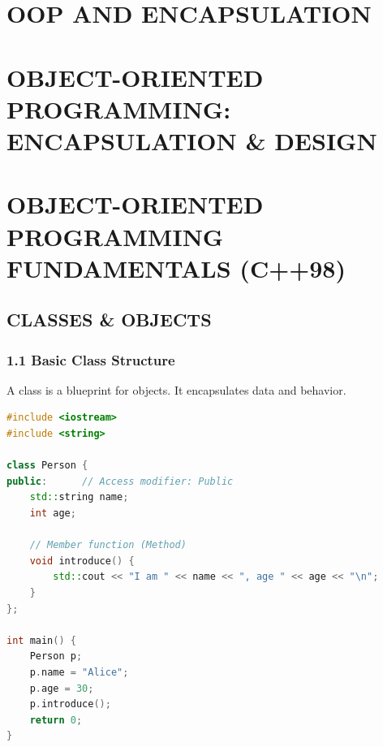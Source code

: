 \hypertarget{oop-and-encapsulation}{%
\chapter{OOP AND ENCAPSULATION}\label{oop-and-encapsulation}}

\hypertarget{object-oriented-programming-encapsulation-design}{%
\chapter{OBJECT-ORIENTED PROGRAMMING: ENCAPSULATION \&
DESIGN}\label{object-oriented-programming-encapsulation-design}}

\hypertarget{object-oriented-programming-fundamentals-c98}{%
\chapter{OBJECT-ORIENTED PROGRAMMING FUNDAMENTALS
(C++98)}\label{object-oriented-programming-fundamentals-c98}}

\hypertarget{classes-objects}{%
\section{CLASSES \& OBJECTS}\label{classes-objects}}

\hypertarget{basic-class-structure}{%
\subsection{1.1 Basic Class Structure}\label{basic-class-structure}}

A class is a blueprint for objects. It encapsulates data and behavior.

\begin{lstlisting}[language={C++}]
#include <iostream>
#include <string>

class Person {
public:      // Access modifier: Public
    std::string name;
    int age;
    
    // Member function (Method)
    void introduce() {
        std::cout << "I am " << name << ", age " << age << "\n";
    }
};

int main() {
    Person p;
    p.name = "Alice";
    p.age = 30;
    p.introduce();
    return 0;
}
\end{lstlisting}


